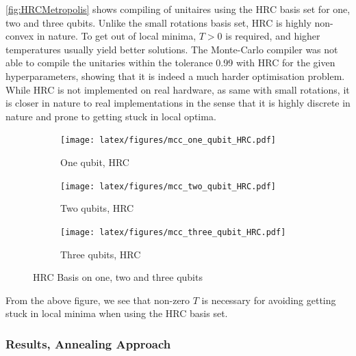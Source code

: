 \documentclass{article}
\begin{document}
\autoref{fig:HRCMetropolis} shows compiling of unitaires using the HRC basis set for one, two and three qubits. Unlike the small rotations basis set, HRC is highly non-convex in nature. To get out of local minima, $T>0$ is required, and higher temperatures usually yield better solutions. The Monte-Carlo compiler was not able to compile the unitaries within the tolerance 0.99 with HRC for the given hyperparameters, showing that it is indeed a much harder optimisation problem. While HRC is not implemented on real hardware, as same with small rotations, it is closer in nature to real implementations in the sense that it is highly discrete in nature and prone to getting stuck in local optima.



\begin{figure}[H]
\begin{subfigure}{.5\textwidth} 
    \centering
    \texttt{[image: latex/figures/mcc\_one\_qubit\_HRC.pdf]}  %
    \caption{One qubit, HRC}
    \label{fig:sub-first}
\end{subfigure}
\begin{subfigure}{.5\textwidth}
    \centering
    \texttt{[image: latex/figures/mcc\_two\_qubit\_HRC.pdf]}  
    \caption{Two qubits, HRC}
    \label{fig:sub-second}
\end{subfigure}


\begin{subfigure}{\textwidth}
    \centering
    \texttt{[image: latex/figures/mcc\_three\_qubit\_HRC.pdf]}   %
    \caption{Three qubits, HRC}
    \label{fig:sub-firstA}
\end{subfigure}
\caption{HRC Basis on one, two and three qubits}
\label{fig:HRCMetropolis}
\end{figure}

From the above figure, we see that non-zero $T$ is necessary for avoiding getting stuck in local minima when using the HRC basis set.

\subsubsection*{Results, Annealing Approach}
\end{document}
